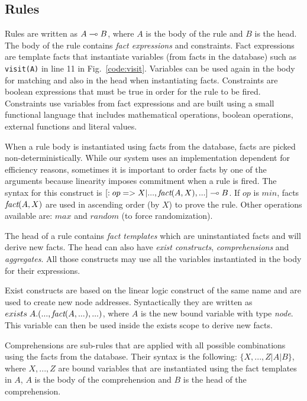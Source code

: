 \subsection{Rules}

Rules are written as $A \multimap B$, where $A$ is the body of the rule and $B$ is the head.
The body of the rule contains \emph{fact expressions} and constraints.
Fact expressions are template facts that instantiate variables (from facts in the database)
such as \texttt{visit(A)} in line 11 in Fig.~\ref{code:visit}. Variables can be used again in the body for matching and
also in the head when instantiating facts. Constraints are boolean expressions that must
be true in order for the rule to be fired. Constraints use variables from fact expressions and are built using a small functional language that includes mathematical operations, boolean operations, external functions and literal values.

When a rule body is instantiated using facts from the database, facts are picked non-deterministically.
While our system uses an implementation dependent for efficiency reasons,
sometimes it is important to order facts by one of the arguments because linearity imposes commitment when a rule is fired. The syntax for this construct is $[:op => X | ..., \emph{fact}(A, X), ...] \multimap B$. If $op$ is $min$, facts $\emph{fact}(A, X)$ are used in ascending order (by $X$) to prove the rule. Other operations available are: $max$ and $random$ (to force randomization).

The head of a rule contains \emph{fact templates} which are uninstantiated facts and will derive new facts. The head can also have \emph{exist constructs}, \emph{comprehensions} and \emph{aggregates}. All those constructs may use all the variables instantiated in the body for their expressions.

Exist constructs are based on the linear logic construct of the same name and are used to create new node addresses. Syntactically they are written as $exists \; A. (..., \emph{fact}(A, ...), ...)$, where $A$ is the new bound variable with type \emph{node}. This variable can then be used inside the exists scope to derive new facts.

Comprehensions are sub-rules that are applied with all possible combinations using the facts from the database. Their syntax is the following: $\{X, ..., Z | A | B\}$, where $X, ..., Z$ are bound variables that are instantiated using the fact templates in $A$, $A$ is the body of the comprehension and $B$ is the head of the comprehension.

